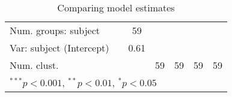 \documentclass[11pt,letter]{article}\usepackage[]{graphicx}\usepackage[]{color}
\begin{document}
\begin{table}[H]
\begin{center}
\begin{scriptsize}
\begin{tabular}{l c c c c c c }
Num. groups: subject     &                                 & 59                              &                                 &                   &                                 &                                 \\
Var: subject (Intercept) &                                 & 0.61                            &                                 &                   &                                 &                                 \\
Num. clust.              &                                 &                                 & 59                              & 59                & 59                              & 59                              \\
\hline
\multicolumn{7}{l}{\tiny{$^{***}p<0.001$, $^{**}p<0.01$, $^*p<0.05$}}
\end{tabular}
\end{scriptsize}
\caption{Comparing model estimates}
\label{table:coefficients}
\end{center}
\end{table}








\FloatBarrier
\nocite{k1,k2,k3}



\newpage
\appendix
\end{document}
